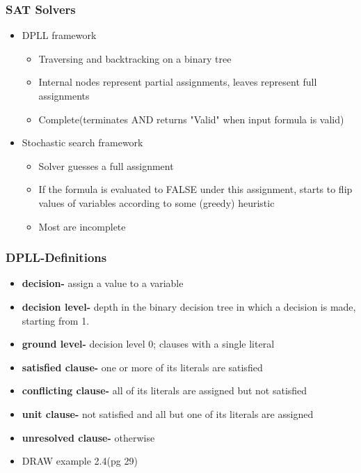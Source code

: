 \documentclass{beamer}
\begin{document}
\begin{frame}

 \frametitle{SAT Solvers}
 
 \begin{itemize}
 
  \item  DPLL framework
 
    \begin{itemize}
 
    \item  Traversing and backtracking on a binary tree
    \item Internal nodes represent partial assignments, leaves represent full assignments
    \item Complete(terminates AND returns "Valid" when input formula is valid)
 
   \end{itemize}
   
  \item Stochastic search framework
  
    \begin{itemize}
 
    \item  Solver guesses a full assignment
    \item If the formula is evaluated to FALSE under this assignment, starts to flip values of variables according to some (greedy) heuristic
    \item Most are incomplete
 
   \end{itemize}
 
 \end{itemize}
 
\end{frame}

\begin{frame}

 \frametitle{DPLL-Definitions}
 
 \begin{itemize}
 
  \item  \textbf{decision-} assign a value to a variable
 \item  \textbf{decision level-} depth in the binary decision tree in which a decision is made, starting from 1.
  \item  \textbf{ground level-} decision level 0;  clauses with a single literal
   \item  \textbf{satisfied clause-} one or more of its literals are satisfied
   \item  \textbf{conflicting clause-} all of its literals are assigned but not satisfied
   \item  \textbf{unit clause-} not satisfied and all but one of its literals are assigned
   \item  \textbf{unresolved clause-} otherwise
   
   \item DRAW example 2.4(pg 29)
 
 
 \end{itemize}
 
\end{frame}
\end{document}
